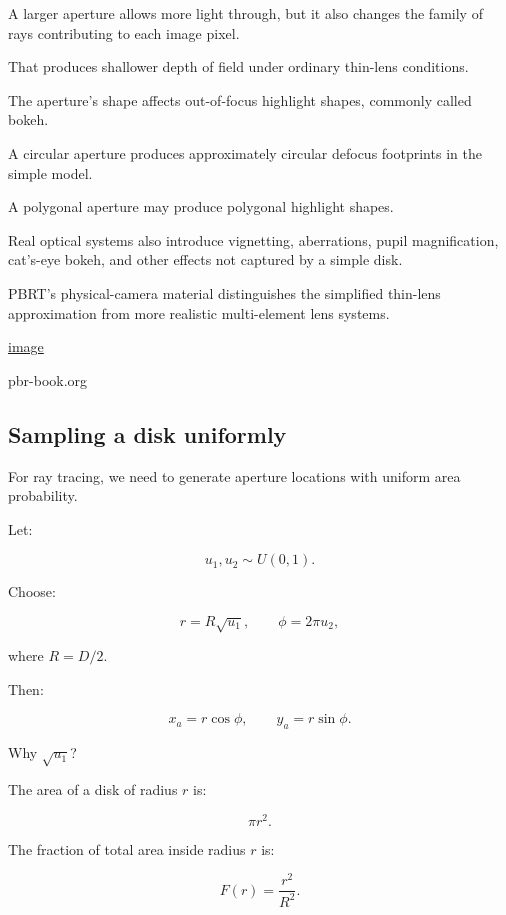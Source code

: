 \hypertarget{02-foundations-ii-ch036-aperture-affects-more-than-brightness}{}

A larger aperture allows more light through, but it also changes the family of rays contributing to each image pixel.

That produces shallower depth of field under ordinary thin-lens conditions.

The aperture's shape affects out-of-focus highlight shapes, commonly called bokeh.

A circular aperture produces approximately circular defocus footprints in the simple model.

A polygonal aperture may produce polygonal highlight shapes.

Real optical systems also introduce vignetting, aberrations, pupil magnification, cat's-eye bokeh, and other effects not captured by a simple disk.

PBRT's physical-camera material distinguishes the simplified thin-lens approximation from more realistic multi-element lens systems. 

\href{https://www.google.com/s2/favicons?domain=https://www.pbr-book.org&sz=32}{image}

pbr-book.org

\subsection{Sampling a disk uniformly}\label{02-foundations-ii-ch036-sampling-a-disk-uniformly}

\hypertarget{02-foundations-ii-ch036-sampling-a-disk-uniformly}{}

For ray tracing, we need to generate aperture locations with uniform area probability.

Let:

\[ u_1,u_2\sim U(0,1). \]

Choose:

\[ \boxed{ r=R\sqrt{u_1}, \qquad \phi=2\pi u_2, } \]

where \(R=D/2\).

Then:

\[ \boxed{ x_a=r\cos\phi, \qquad y_a=r\sin\phi. } \]

Why \(\sqrt{u_1}\)?

The area of a disk of radius \(r\) is:

\[ \pi r^2. \]

The fraction of total area inside radius \(r\) is:

\[ F(r)=\frac{r^2}{R^2}. \]

